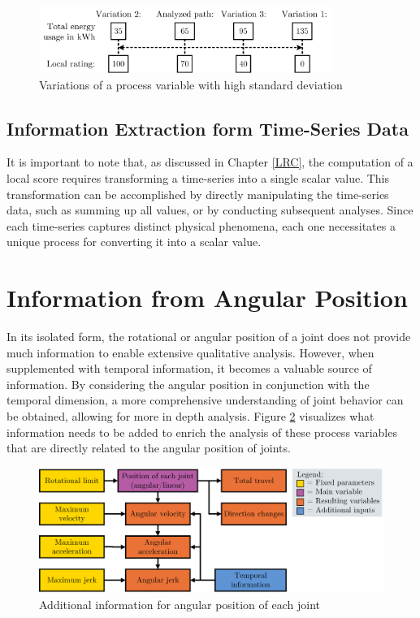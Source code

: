 \begin{figure}[H]
	\centerline{\includegraphics[width=0.85\textwidth]{figures/highstd.png}}
	\caption{Variations of a process variable with high standard deviation}
	\label{highstd}
\end{figure}

 
\subsection{Information Extraction form Time-Series Data}\label{extraction}
It is important to note that, as discussed in Chapter \ref{LRC}, the computation of a local score requires transforming a time-series into a single scalar value. This transformation can be accomplished by directly manipulating the time-series data, such as summing up all values, or by conducting subsequent analyses. Since each time-series captures distinct physical phenomena, each one necessitates a unique process for converting it into a scalar value.




\newpage
\section{Information from Angular Position}
In its isolated form, the rotational or angular position of a joint does not provide much information to enable extensive qualitative analysis. However, when supplemented with temporal information, it becomes a valuable source of information. By considering the angular position in conjunction with the temporal dimension, a more comprehensive understanding of joint behavior can be obtained, allowing for more in depth analysis. 
Figure \ref{agularstuff} visualizes what information needs to be added to enrich the analysis of these process variables that are directly related to the angular position of joints.

\begin{figure}[H]
	\centerline{\includegraphics[width=1\textwidth]{figures/angularstuff.png}}
	\caption{Additional information for angular position of each joint}
	\label{agularstuff}
\end{figure}


